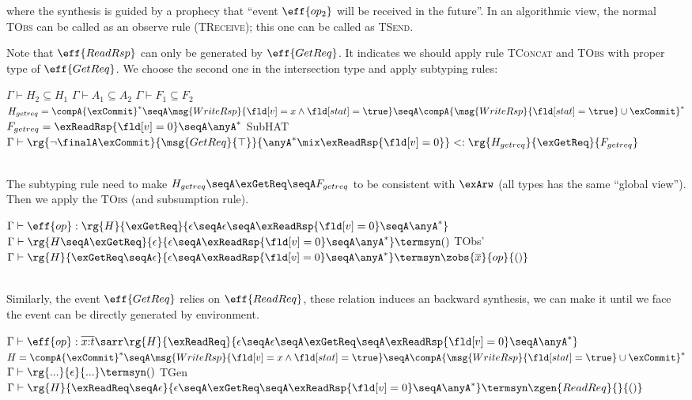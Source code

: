 where the synthesis is guided by a prophecy that ``event $\eff{op_2}$ will be received in the future''. In an algorithmic view, the normal \textsc{TObs} can be called as an observe rule (\textsc{TReceive}); this one can be called as \textsc{TSend}.

Note that $\eff{ReadRsp}$ can only be generated by $\eff{GetReq}$. It indicates we should apply rule \textsc{TConcat} and \textsc{TObs} with proper type of $\eff{GetReq}$. We choose the second one in the intersection type and apply subtyping rules:

{\footnotesize\mprooftr{130mm}
{$\Gamma \vdash H_2 \subseteq H_1$ \quad
$\Gamma \vdash A_1 \subseteq A_2$ \quad
$\Gamma \vdash F_1 \subseteq F_2$ \quad
$H_{getreq} = \compA{\exCommit}^* \seqA \msg{WriteRsp}{\fld[v] = x \land \fld[stat] = \true} \seqA \compA{ \msg{WriteRsp}{\fld[stat] = \true}\cup\exCommit }^*$ \quad 
$F_{getreq} = \exReadRsp{\fld[v] = 0} \seqA \anyA^*$}
{SubHAT}
{
$\Gamma \vdash \rg{\neg\finalA \exCommit}{\msg{GetReq}{\top}}{\anyA^* \mix \exReadRsp{\fld[v] = 0} } <:  \rg{ H_{getreq} }{\exGetReq}{F_{getreq}} $}}
\\ \ 

The subtyping rule need to make $H_{getreq} \seqA \exGetReq \seqA F_{getreq}$ to be consistent with $\exArw$ (all types has the same ``global view''). Then we apply the \textsc{TObs} (and subsumption rule).

{\footnotesize\mprooftr{105mm}
{
$\Gamma \vdash \eff{op} : \rg{H}{\exGetReq}{\epsilon \seqA \epsilon \seqA \exReadRsp{\fld[v] = 0} \seqA \anyA^*}$ 
\quad
 $\Gamma \vdash \rg{H \seqA \exGetReq}{\epsilon}{\epsilon \seqA \exReadRsp{\fld[v] = 0} \seqA \anyA^*} \termsyn ()$}
{TObs'}
{$\Gamma \vdash \rg{H}{\exGetReq \seqA \epsilon}{\epsilon \seqA \exReadRsp{\fld[v] = 0} \seqA \anyA^*} \termsyn \zobs{\overline{x}}{op}{()}$}}
\\ \ 

Similarly, the event $\eff{GetReq}$ relies on $\eff{ReadReq}$, these relation induces an backward synthesis, we can make it until we face the event can be directly generated by environment. 

{\footnotesize\mprooftr{130mm}
{
$\Gamma \vdash \eff{op} : \overline{x{:}t}\sarr \rg{H}{\exReadReq}{\epsilon\seqA\epsilon\seqA\exGetReq\seqA\exReadRsp{\fld[v] = 0} \seqA \anyA^*}$ 
\quad
$H = \compA{\exCommit}^* \seqA \msg{WriteRsp}{\fld[v] = x \land \fld[stat] = \true} \seqA \compA{ \msg{WriteRsp}{\fld[stat] = \true}\cup\exCommit }^*$ \quad 
 $\Gamma \vdash \rg{...}{\epsilon}{...} \termsyn ()$}
{TGen}
{$\Gamma \vdash \rg{H}{\exReadReq \seqA \epsilon}{ \epsilon\seqA\exGetReq\seqA\exReadRsp{\fld[v] = 0} \seqA \anyA^*}  \termsyn \zgen{ReadReq}{}{()}$}}
\\ \ 

